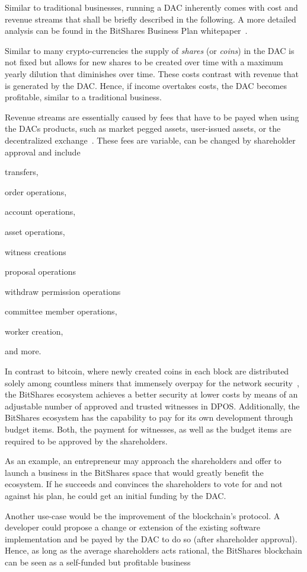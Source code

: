 \label{sec:token:supply}

Similar to traditional businesses, running a DAC inherently comes with cost and
revenue streams that shall be briefly described in the following. A more
detailed analysis can be found in the BitShares Business Plan
whitepaper~\cite{}.

Similar to many crypto-currencies the supply of \emph{shares} (or \emph{coins})
in the DAC is not fixed but allows for new shares to be created over time with
a maximum yearly dilution that diminishes over time. These costs contrast with
revenue that is generated by the DAC. Hence, if income overtakes costs, the DAC
becomes profitable, similar to a traditional business.

Revenue streams are essentially caused by fees that have to be payed when using
the DACs products, such as market pegged assets, user-issued assets, or the
decentralized exchange~\cite{bts:financial}. These fees are variable, can be
changed by shareholder approval and include
\begin{inparaenum}[(a)]
 \item transfers,
 \item order operations,
 \item account operations,
 \item asset operations,
 \item witness creations
 \item proposal operations
 \item withdraw permission operations
 \item committee member operations,
 \item worker creation,
\end{inparaenum}
and more.

In contrast to bitcoin, where newly created coins in each block are distributed
solely among countless miners that immensely overpay for the network
security~\cite{ltb:dac}, the BitShares ecosystem achieves a better security at
lower costs by means of an adjustable number of approved and trusted witnesses
in DPOS. Additionally, the BitShares ecosystem has the capability to pay for
its own development through budget items. Both, the payment for witnesses, as
well as the budget items are required to be approved by the shareholders.

As an example, an entrepreneur may approach the shareholders and offer to
launch a business in the BitShares space that would greatly benefit the
ecosystem. If he succeeds and convinces the shareholders to vote for and not
against his plan, he could get an initial funding by the DAC.

Another use-case would be the improvement of the blockchain's protocol. A
developer could propose a change or extension of the existing software
implementation and be payed by the DAC to do so (after shareholder approval).
Hence, as long as the average shareholders acts rational, the BitShares
blockchain can be seen as a self-funded but profitable business
